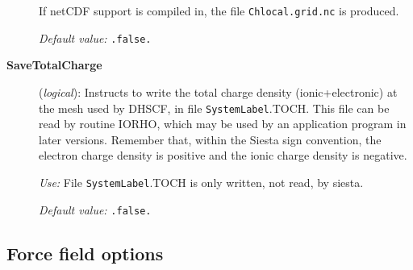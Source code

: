\documentclass[11pt]{article}
\begin{document}
\begin{description}
If netCDF support is compiled in, the file {\tt Chlocal.grid.nc} is produced.

{\it Default value:} {\tt .false.}
        
\item[{\bf SaveTotalCharge}] ({\it logical}): 
Instructs to write the total charge density (ionic+electronic) at the
mesh used by DHSCF,
in file {\tt SystemLabel}.TOCH. This file can be read by routine IORHO,
which may be used by an application program in later versions.
Remember that, within the {\sc Siesta} sign convention, the electron charge
density is positive and the ionic charge density is negative. 

{\it Use:} File {\tt SystemLabel}.TOCH is only written, not read, by siesta.

{\it Default value:} {\tt .false.}

\end{description}

\vspace{5pt}
\subsection{Force field options}
\end{document}

